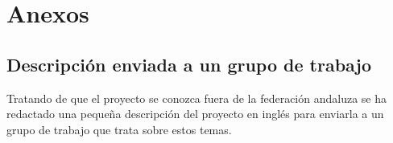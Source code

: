 



\tableofcontents





 







\chapter{Anexos}
    \section{Descripción enviada a un grupo de trabajo}

    Tratando de que el proyecto se conozca fuera de la federación andaluza
    se ha redactado una pequeña descripción del proyecto en inglés para
    enviarla a un grupo de trabajo que trata sobre estos temas.

